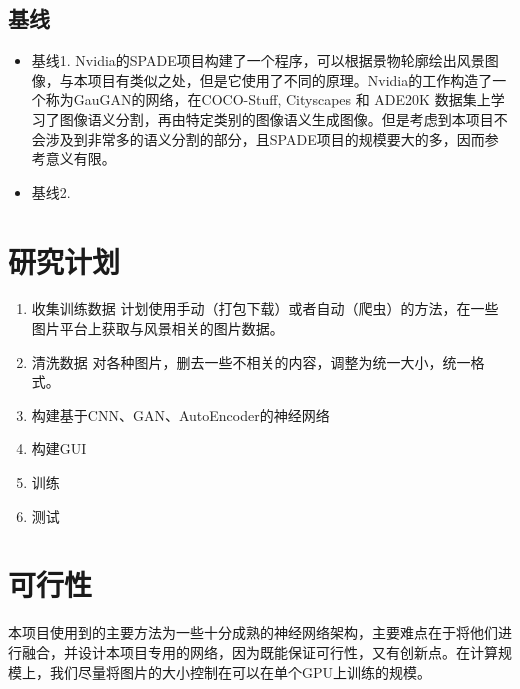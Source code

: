 \documentclass{article}
\begin{document}
\subsection{基线}

\begin{itemize}

\item 基线1.
Nvidia的SPADE项目构建了一个程序，可以根据景物轮廓绘出风景图像，与本项目有类似之处，但是它使用了不同的原理。Nvidia的工作构造了一个称为GauGAN的网络，在COCO-Stuff, Cityscapes 和 ADE20K 数据集上学习了图像语义分割，再由特定类别的图像语义生成图像。但是考虑到本项目不会涉及到非常多的语义分割的部分，且SPADE项目的规模要大的多，因而参考意义有限。
\item 基线2.

\end{itemize}

\section{研究计划}

\begin{enumerate}
	\item 收集训练数据
	计划使用手动（打包下载）或者自动（爬虫）的方法，在一些图片平台上获取与风景相关的图片数据。
	\item 清洗数据
	对各种图片，删去一些不相关的内容，调整为统一大小，统一格式。
	\item 构建基于CNN、GAN、AutoEncoder的神经网络
	\item 构建GUI
	\item 训练
	\item 测试
\end{enumerate}

\section{可行性}
本项目使用到的主要方法为一些十分成熟的神经网络架构，主要难点在于将他们进行融合，并设计本项目专用的网络，因为既能保证可行性，又有创新点。在计算规模上，我们尽量将图片的大小控制在可以在单个GPU上训练的规模。
\end{document}

